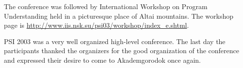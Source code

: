 \documentclass[final]{beatcs}
\begin{document}
 The conference was followed by International Workshop on Program
 Understanding held in a picturesque place of Altai mountains. The
 workshop page is 
 \url{http://www.iis.nsk.su/psi03/workshop/index_e.shtml}.
 

 PSI 2003 was a very well organized high-level conference. The last
 day the participants thanked the organizers for the good organization
 of the conference and expressed their desire to come to Akademgorodok
 once again. 
\end{document}
